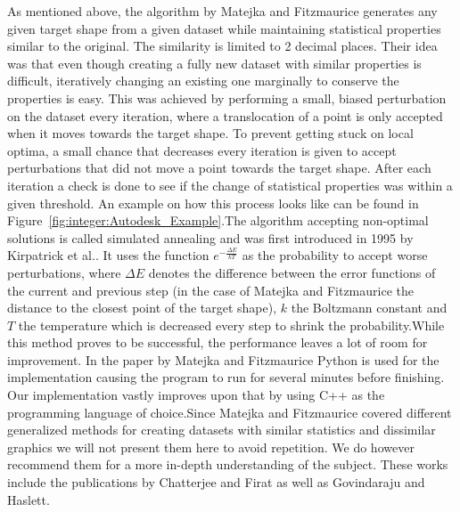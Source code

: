 \documentclass[sigconf]{acmart}
\begin{document}
As mentioned above, the algorithm by Matejka and Fitzmaurice\cite{10.1145/3025453.3025912} generates any given target shape from a given dataset while maintaining statistical properties similar to the original. The similarity is limited
to 2 decimal places. Their idea was that even though creating a fully new dataset with similar properties is difficult, iteratively changing an existing one marginally to conserve the properties is easy. This was achieved by performing a small, biased 
perturbation on the dataset every iteration, where a translocation of a point is only accepted when it moves towards the target shape. To prevent getting stuck on local optima, a small chance that decreases every iteration is given to accept perturbations 
that did not move a point towards the target shape. After each iteration a check is done to see if the change of statistical properties was within a given threshold. An example on how this process looks like can be found in Figure~\ref*{fig:integer:Autodesk_Example}.\newpage The algorithm
accepting non-optimal solutions is called simulated annealing and was first introduced in 1995 by Kirpatrick et al.\cite{kirkpatrick1995simulated}. It uses the function \(e^{-\frac{\Delta E}{kT}}\) as the probability to accept worse
perturbations, where \(\Delta E\) denotes the difference between the error functions of the current and previous step (in the case of Matejka and Fitzmaurice the distance to the closest point of the target shape), \(k\) the Boltzmann constant and \(T\)
the temperature which is decreased every step to shrink the probability.\newline\newline While this method proves to be successful, the performance leaves a lot of room for improvement. In the paper by Matejka and Fitzmaurice Python is used for the implementation
causing the program to run for several minutes before finishing. Our implementation vastly improves upon that by using C++ as the programming language of choice.\newline\newline Since Matejka and Fitzmaurice covered different generalized methods for creating datasets with
similar statistics and dissimilar graphics we will not present them here to avoid repetition. We do however recommend them for a more in-depth understanding of the subject. These works include the publications by Chatterjee and Firat\cite{10.2307/27643902} as well as 
Govindaraju and Haslett\cite{https://doi.org/10.1111/j.1467-842X.2009.00560.x}. 
\end{document}
